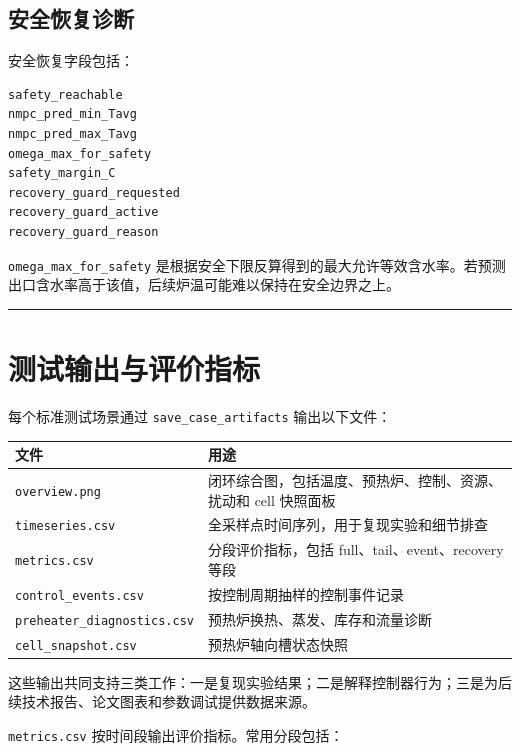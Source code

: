 \documentclass[UTF8,openany,zihao=-4,oneside]{ctexbook}
\providecommand{\passthrough}[1]{#1}
\newcommand{\manualdivider}{\par\vspace{0.6em}\noindent\textcolor{FGLine}{\rule{\linewidth}{0.7pt}}\vspace{0.6em}\par}
\begin{document}
\subsection{安全恢复诊断}\label{subsec:history-safety-recovery}

安全恢复字段包括：

\begin{lstlisting}
safety_reachable
nmpc_pred_min_Tavg
nmpc_pred_max_Tavg
omega_max_for_safety
safety_margin_C
recovery_guard_requested
recovery_guard_active
recovery_guard_reason
\end{lstlisting}

\passthrough{\lstinline!omega_max_for_safety!} 是根据安全下限反算得到的最大允许等效含水率。若预测出口含水率高于该值，后续炉温可能难以保持在安全边界之上。

\manualdivider

\section{测试输出与评价指标}\label{sec:test-artifacts}

每个标准测试场景通过 \passthrough{\lstinline!save_case_artifacts!} 输出以下文件：

\begin{longtable}[c]{@{}p{}p{}@{}}
\toprule\noalign{}
文件 & 用途 \\
\midrule\noalign{}
\endhead
\bottomrule\noalign{}
\endlastfoot
\passthrough{\lstinline!overview.png!} & 闭环综合图，包括温度、预热炉、控制、资源、扰动和 cell 快照面板 \\
\passthrough{\lstinline!timeseries.csv!} & 全采样点时间序列，用于复现实验和细节排查 \\
\passthrough{\lstinline!metrics.csv!} & 分段评价指标，包括 full、tail、event、recovery 等段 \\
\passthrough{\lstinline!control_events.csv!} & 按控制周期抽样的控制事件记录 \\
\passthrough{\lstinline!preheater_diagnostics.csv!} & 预热炉换热、蒸发、库存和流量诊断 \\
\passthrough{\lstinline!cell_snapshot.csv!} & 预热炉轴向槽状态快照 \\
\end{longtable}

这些输出共同支持三类工作：一是复现实验结果；二是解释控制器行为；三是为后续技术报告、论文图表和参数调试提供数据来源。

\passthrough{\lstinline!metrics.csv!} 按时间段输出评价指标。常用分段包括：
\end{document}
